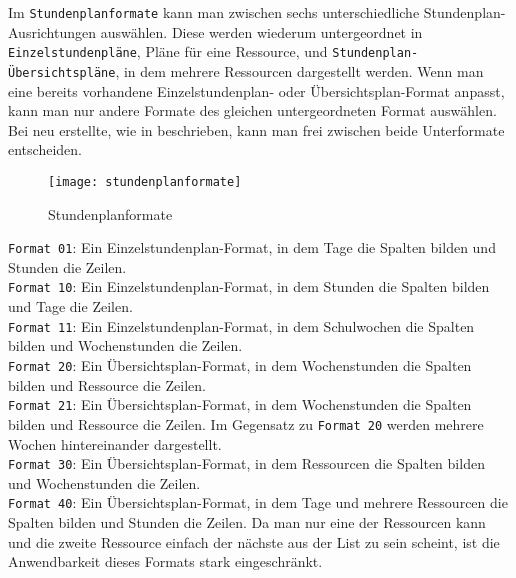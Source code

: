 \noindent
Im \texttt{Stundenplanformate} kann man zwischen sechs unterschiedliche Stundenplan-Ausrichtungen auswählen. Diese werden wiederum untergeordnet in \texttt{Einzelstundenpläne}, Pläne für eine Ressource, und \texttt{Stundenplan-Übersichtspläne}, in dem mehrere Ressourcen dargestellt werden. Wenn man eine bereits vorhandene Einzelstundenplan- oder Übersichtsplan-Format anpasst, kann man nur andere Formate des gleichen untergeordneten Format auswählen. Bei neu erstellte, wie in  beschrieben, kann man frei zwischen beide Unterformate entscheiden.\\

\begin{wrapfigure}{r}{0.4\textwidth}
	\vspace{-14pt}
	\centering
	\texttt{[image: stundenplanformate]}
	\vspace{-5pt}
	\caption{Stundenplanformate}
	\label{fig:stundenplanformate}
	\vspace{-15pt}
\end{wrapfigure}

\noindent
\texttt{Format 01}: Ein Einzelstundenplan-Format, in dem Tage die Spalten bilden und Stunden die Zeilen.\\

\noindent
\texttt{Format 10}: Ein Einzelstundenplan-Format, in dem Stunden die Spalten bilden und Tage die Zeilen.\\

\noindent
\texttt{Format 11}: Ein Einzelstundenplan-Format, in dem Schulwochen die Spalten bilden und Wochenstunden die Zeilen.\\

\noindent
\texttt{Format 20}: Ein Übersichtsplan-Format, in dem Wochenstunden die Spalten bilden und Ressource die Zeilen.\\

\noindent
\texttt{Format 21}: Ein Übersichtsplan-Format, in dem Wochenstunden die Spalten bilden und Ressource die Zeilen. Im Gegensatz zu \texttt{Format 20} werden mehrere Wochen hintereinander dargestellt.\\

\noindent
\texttt{Format 30}: Ein Übersichtsplan-Format, in dem Ressourcen die Spalten bilden und Wochenstunden die Zeilen.\\

\noindent
\texttt{Format 40}: Ein Übersichtsplan-Format, in dem Tage und mehrere Ressourcen die Spalten bilden und Stunden die Zeilen. Da man nur eine der Ressourcen kann und die zweite Ressource einfach der nächste aus der List zu sein scheint, ist die Anwendbarkeit dieses Formats stark eingeschränkt.\\

